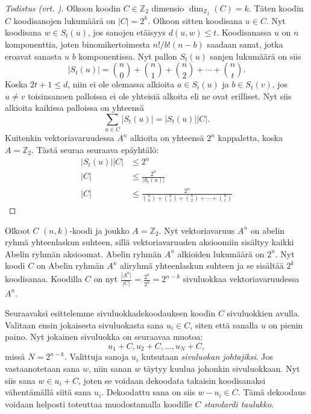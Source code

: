 \documentclass[a4paper,12pt,leqno,oneside]{report} %
\theoremstyle{plain}
\theoremstyle{definition}
\theoremstyle{remark}
\numberwithin{equation}{chapter}
\newcommand*{\Zset}{\mathbb{Z}}  %
\newcommand*{\abs}[1]{\left\lvert#1\right\rvert}   %
\begin{document}
    \begin{proof}[Todistus \upshape(vrt. {\cite[s.495]{PA}})]\label{tod:Hammingrajoitus}
        Olkoon koodin $C \in \Zset_2$ dimensio $\dim_{\Zset_2}(C) = k$. Täten koodin $C$ koodisanojen lukumäärä on $\abs{C} = 2^k$. Olkoon sitten koodisana $u \in C$. Nyt koodisana $w \in S_t(u)$, jos sanojen etäisyys $d(u,w) \le t$. Koodisanassa $u$ on $n$ komponenttia, joten binomikertoimesta $n! / b!(n-b)\!$ saadaan sanat, jotka eroavat sanasta $u$ $b$ komponentissa. Nyt pallon $S_t(u)$ sanjen lukumäärä on siis
        \[
            \abs{S_t(u)} = \binom{n}{0} + \binom{n}{1} +\binom{n}{2} +  \cdots + \binom{n}{t}.
        \]
        Koska $2t + 1 \le d$, niin ei ole olemassa alkioita $a \in S_t(u)$ ja $b \in S_t(v)$, jos $u \neq v$ toisinsanoen palloissa ei ole yhteisiä alkoita eli ne ovat erilliset. Nyt siis alkioita kaikissa palloissa on yhteensä
        \[
            \sum_{u \in C}\abs{S_t(u)} = \abs{S_t(u)}\abs{C}.
        \]
        Kuitenkin vektoriavaruudessa $A^n$ alkioita on yhteensä $2^n$ kappaletta, koska $A = \Zset_2$.
        Tästä seuraa seuraava epäyhtälö:
        \begin{align*}
            \abs{S_t(u)}\abs{C} &\le 2^n \\
            \abs{C} &\le \frac{2^n}{\abs{S_t(u)}} \\
            \abs{C} &\le \frac{2^n}{\binom{n}{0} + \binom{n}{1} +\binom{n}{2} +  \cdots + \binom{n}{t}}
        \end{align*}
    \end{proof}

    Olkoot $C$ $(n,k)$-koodi ja joukko $A = \Zset_2$. Nyt vektoriavaruus $A^n$ on abelin ryhmä yhteenlaskun suhteen, sillä vektoriavaruuden aksioomiin sisältyy kaikki Abelin ryhmän aksioomat. Abelin ryhmän $A^n$ alkioiden lukumäärä on $2^n$. Nyt koodi $C$ on Abelin ryhmän $A^n$ aliryhmä yhteenlaskun suhteen ja se sisältää $2^k$ koodisanaa. Koodilla $C$ on nyt $\frac{\abs{A^n}}{\abs{C}} = \frac{2^n}{2^k} = 2^{n-k}$ sivuluokkaa vektoriavaruudessa $A^n$.

    Seuraavaksi esittelemme sivuluokkadekoodauksen koodin $C$ sivuluokkien avulla. Valitaan ensin jokaisesta sivuluokasta sana $u_i \in C$, siten että sanalla $u$ on pienin paino. Nyt jokainen sivuluokka on seuraavaa muotoa:
    \[
        u_1 + C, u_2 + C, \dots, u_N + C,
    \]
    missä $N = 2^{n-k}$. Valittuja sanoja $u_i$ kutsutaan \emph{sivuluokan johtajiksi}. Jos vastaanotetaan sana $w$, niin sanan $w$ täytyy kuulua johonkin sivuluokkaan. Nyt siis sana $w \in u_i + C$, joten se voidaan dekoodata takaisin koodisanaksi vähentämällä siitä sana $u_i$. Dekoodattu sana on siis $w - u_i \in C$. Tämä dekoodaus voidaan helposti toteuttaa muodostamalla koodille $C$ \emph{standardi taulukko}.
\end{document}
